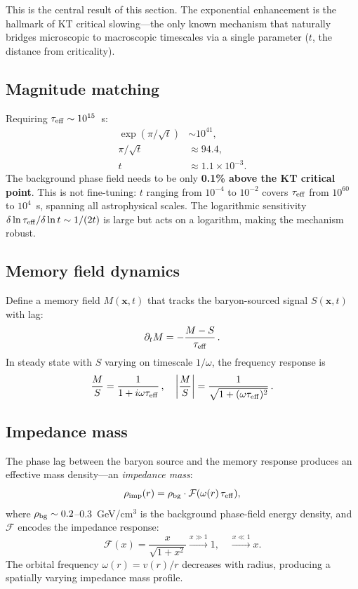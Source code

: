 ﻿\documentclass[a4paper,12pt]{article}
\begin{document}
This is the central result of this section.  The exponential enhancement
is the hallmark of KT critical slowing---the only known mechanism that
naturally bridges microscopic to macroscopic timescales via a single
parameter ($t$, the distance from criticality).

\subsection{Magnitude matching}

Requiring $\tau_{\rm eff}\sim 10^{15}$~s:
\begin{align}
  \exp(\pi/\sqrt{t}) &\sim 10^{41}, \nonumber\\
  \pi/\sqrt{t} &\approx 94.4, \nonumber\\
  t &\approx 1.1\times 10^{-3}.
  \label{eq:tmatch}
\end{align}
The background phase field needs to be only \textbf{0.1\% above the KT
critical point}.  This is not fine-tuning: $t$ ranging from $10^{-4}$
to $10^{-2}$ covers $\tau_{\rm eff}$ from $10^{60}$ to $10^4$~s,
spanning all astrophysical scales.  The logarithmic sensitivity
$\delta\ln\tau_{\rm eff}/\delta\ln t\sim 1/(2t)$ is large but acts on a
logarithm, making the mechanism robust.

\subsection{Memory field dynamics}

Define a memory field $M(\mathbf{x},t)$ that tracks the baryon-sourced
signal $S(\mathbf{x},t)$ with lag:
\begin{equation}
  \partial_t M = -\frac{M-S}{\tau_{\rm eff}}\,.
  \label{eq:memory}
\end{equation}
In steady state with $S$ varying on timescale $1/\omega$, the
frequency response is
\begin{equation}
  \frac{M}{S} = \frac{1}{1+i\omega\tau_{\rm eff}}\,,\quad
  \left|\frac{M}{S}\right| = \frac{1}{\sqrt{1+(\omega\tau_{\rm eff})^2}}\,.
\end{equation}

\subsection{Impedance mass}

The phase lag between the baryon source and the memory response produces
an effective mass density---an \emph{impedance mass}:
\begin{equation}
  \rho_{\rm imp}(r) = \rho_{\rm bg}\cdot
    \mathcal{F}(\omega(r)\,\tau_{\rm eff}),
  \label{eq:rhoimp}
\end{equation}
where $\rho_{\rm bg}\sim 0.2$--$0.3$~GeV/cm$^3$ is the background
phase-field energy density, and $\mathcal{F}$ encodes the impedance response:
\begin{equation}
  \mathcal{F}(x) = \frac{x}{\sqrt{1+x^2}}
    \xrightarrow{x\gg 1} 1,\quad
    \xrightarrow{x\ll 1} x.
\end{equation}
The orbital frequency $\omega(r)=v(r)/r$ decreases with radius,
producing a spatially varying impedance mass profile.
\end{document}
